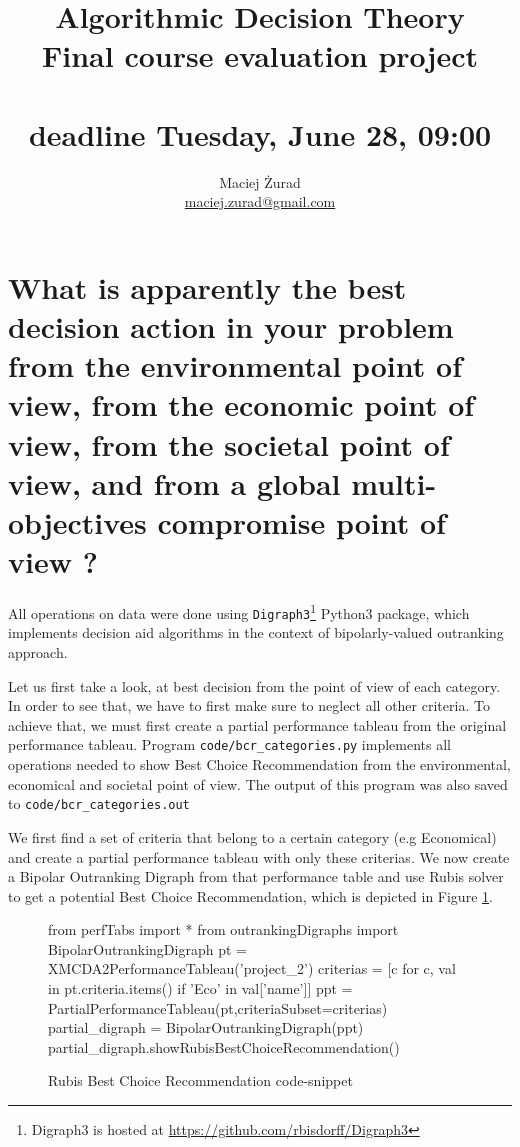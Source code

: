 \documentclass[a4paper]{article}
\begin{document}
 \title{\textbf{Algorithmic Decision Theory} \\ Final course evaluation project
 \\  ~\\ \normalsize{deadline Tuesday, June 28, 09:00}}
 \author{Maciej Żurad \\ \url{maciej.zurad@gmail.com}}

\date{}

\maketitle



\section{What is apparently the best decision action in your problem from the environmental point of view, from the economic point of view, from the societal point of view, and from a global multi-objectives compromise point of view ?}

All operations on data were done using \texttt{Digraph3}\footnote{Digraph3 is hosted at \url{https://github.com/rbisdorff/Digraph3}} Python3 package, which implements decision aid algorithms in the context of bipolarly-valued outranking approach.

Let us first take a look, at best decision from the point of view of each category. In order to see that, we have to first make sure to neglect all other criteria. To achieve that, we must first create a partial performance tableau from the original performance tableau. Program \texttt{code/bcr\_categories.py} implements all operations needed to show Best Choice Recommendation from the environmental, economical and societal point of view. The output of this program was also saved to \texttt{code/bcr\_categories.out}

We first find a set of criteria that belong to a certain category (e.g Economical) and create a partial performance tableau with only these criterias. We now create a Bipolar Outranking Digraph from that performance table and use Rubis\cite{bisdorff2008r, bisdorff2006choices} solver to get a potential Best Choice Recommendation, which is depicted in Figure \ref{lst:rubis}.

\begin{figure}[H]
\begin{center}
\begin{python}
from perfTabs import *
from outrankingDigraphs import BipolarOutrankingDigraph
pt = XMCDA2PerformanceTableau('project_2')
criterias = [c for c, val in pt.criteria.items() if 'Eco' in val['name']]
ppt = PartialPerformanceTableau(pt,criteriaSubset=criterias)
partial_digraph = BipolarOutrankingDigraph(ppt)
partial_digraph.showRubisBestChoiceRecommendation()
\end{python}
\end{center}
\caption{Rubis Best Choice Recommendation code-snippet}
\label{lst:rubis}
\end{figure}
\end{document}
